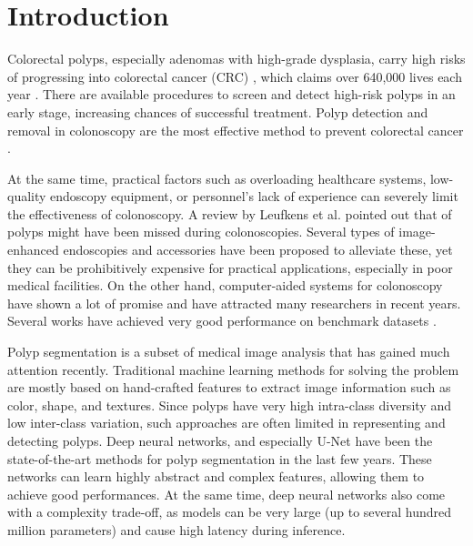 \documentclass{ieeeaccess}
\begin{document}
\titlepgskip=-15pt

\maketitle

\section{Introduction}



Colorectal polyps, especially adenomas with high-grade dysplasia, carry high risks of progressing into colorectal cancer (CRC) \cite{gschwantler2002high}, which claims over 640,000 lives each year \cite{bernal2017comparative}. There are available procedures to screen and detect high-risk polyps in an early stage, increasing chances of successful treatment. Polyp detection and removal in colonoscopy are the most effective method to prevent colorectal cancer \cite{issa2017colorectal}.

At the same time, practical factors such as overloading healthcare systems, low-quality endoscopy equipment, or personnel's lack of experience \cite{armin2015visibility,lee2008adequate} can severely limit the effectiveness of colonoscopy. A review by Leufkens et al. \cite{leufkens2012factors} pointed out that  of polyps might have been missed during colonoscopies. Several types of image-enhanced endoscopies and accessories have been proposed to alleviate these, yet they can be prohibitively expensive for practical applications, especially in poor medical facilities. On the other hand, computer-aided systems for colonoscopy have shown a lot of promise and have attracted many researchers in recent years. Several works have achieved very good performance on benchmark datasets \cite{fan2020pranet,huang2021hardnet,tang2019cu}.

Polyp segmentation is a subset of medical image analysis that has gained much attention recently. Traditional machine learning methods for solving the problem are mostly based on hand-crafted features \cite{iwahori2013automatic,silva2014toward} to extract image information such as color, shape, and textures. Since polyps have very high intra-class diversity and low inter-class variation, such approaches are often limited in representing and detecting polyps. Deep neural networks, and especially U-Net \cite{ronneberger2015u} have been the state-of-the-art methods for polyp segmentation in the last few years. These networks can learn highly abstract and complex features, allowing them to achieve good performances. At the same time, deep neural networks also come with a complexity trade-off, as models can be very large (up to several hundred million parameters) and cause high latency during inference.
\end{document}
